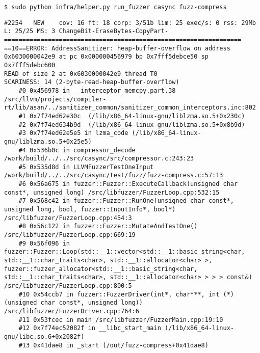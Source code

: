 \documentclass[serif]{beamer}
\begin{document}
\begin{frame}[fragile]
  \tiny
  \begin{verbatim}
$ sudo python infra/helper.py run_fuzzer casync fuzz-compress
  \end{verbatim}
  \begin{verbatim}
#2254	NEW    cov: 16 ft: 18 corp: 3/51b lim: 25 exec/s: 0 rss: 29Mb L: 25/25 MS: 3 ChangeBit-EraseBytes-CopyPart-
=================================================================
==10==ERROR: AddressSanitizer: heap-buffer-overflow on address 0x6030000042e9 at pc 0x000000456979 bp 0x7fff5debce50 sp 0x7fff5debc600
READ of size 2 at 0x6030000042e9 thread T0
SCARINESS: 14 (2-byte-read-heap-buffer-overflow)
    #0 0x456978 in __interceptor_memcpy.part.38 /src/llvm/projects/compiler-rt/lib/asan/../sanitizer_common/sanitizer_common_interceptors.inc:802
    #1 0x7f74ed62e30c  (/lib/x86_64-linux-gnu/liblzma.so.5+0x230c)
    #2 0x7f74ed634b9d  (/lib/x86_64-linux-gnu/liblzma.so.5+0x8b9d)
    #3 0x7f74ed62e5e5 in lzma_code (/lib/x86_64-linux-gnu/liblzma.so.5+0x25e5)
    #4 0x536b0c in compressor_decode /work/build/../../src/casync/src/compressor.c:243:23
    #5 0x535d8d in LLVMFuzzerTestOneInput /work/build/../../src/casync/test/fuzz/fuzz-compress.c:57:13
    #6 0x56a675 in fuzzer::Fuzzer::ExecuteCallback(unsigned char const*, unsigned long) /src/libfuzzer/FuzzerLoop.cpp:532:15
    #7 0x568c42 in fuzzer::Fuzzer::RunOne(unsigned char const*, unsigned long, bool, fuzzer::InputInfo*, bool*) /src/libfuzzer/FuzzerLoop.cpp:454:3
    #8 0x56c122 in fuzzer::Fuzzer::MutateAndTestOne() /src/libfuzzer/FuzzerLoop.cpp:669:19
    #9 0x56f096 in fuzzer::Fuzzer::Loop(std::__1::vector<std::__1::basic_string<char, std::__1::char_traits<char>, std::__1::allocator<char> >, fuzzer::fuzzer_allocator<std::__1::basic_string<char, std::__1::char_traits<char>, std::__1::allocator<char> > > > const&) /src/libfuzzer/FuzzerLoop.cpp:800:5
    #10 0x54ccb7 in fuzzer::FuzzerDriver(int*, char***, int (*)(unsigned char const*, unsigned long)) /src/libfuzzer/FuzzerDriver.cpp:764:6
    #11 0x53fcec in main /src/libfuzzer/FuzzerMain.cpp:19:10
    #12 0x7f74ec52082f in __libc_start_main (/lib/x86_64-linux-gnu/libc.so.6+0x2082f)
    #13 0x41dae8 in _start (/out/fuzz-compress+0x41dae8)


\end{verbatim}
\end{frame}
\end{document}
